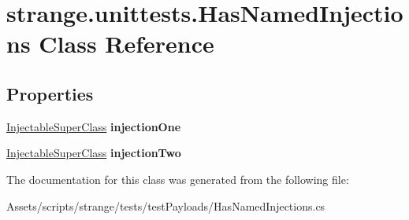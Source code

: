 \hypertarget{classstrange_1_1unittests_1_1_has_named_injections}{\section{strange.\-unittests.\-Has\-Named\-Injections Class Reference}
\label{classstrange_1_1unittests_1_1_has_named_injections}
}
\subsection*{Properties}
\begin{DoxyCompactItemize}
\item 
\hypertarget{classstrange_1_1unittests_1_1_has_named_injections_a864a722a04430def986bd01d1af38717}{\hyperlink{classstrange_1_1unittests_1_1_injectable_super_class}{Injectable\-Super\-Class} {\bfseries injection\-One}}\label{classstrange_1_1unittests_1_1_has_named_injections_a864a722a04430def986bd01d1af38717}

\item 
\hypertarget{classstrange_1_1unittests_1_1_has_named_injections_a71d5e468d3235ca47ba64500383e6eed}{\hyperlink{classstrange_1_1unittests_1_1_injectable_super_class}{Injectable\-Super\-Class} {\bfseries injection\-Two}}\label{classstrange_1_1unittests_1_1_has_named_injections_a71d5e468d3235ca47ba64500383e6eed}

\end{DoxyCompactItemize}


The documentation for this class was generated from the following file\-:\begin{DoxyCompactItemize}
\item 
Assets/scripts/strange/tests/test\-Payloads/Has\-Named\-Injections.\-cs\end{DoxyCompactItemize}
